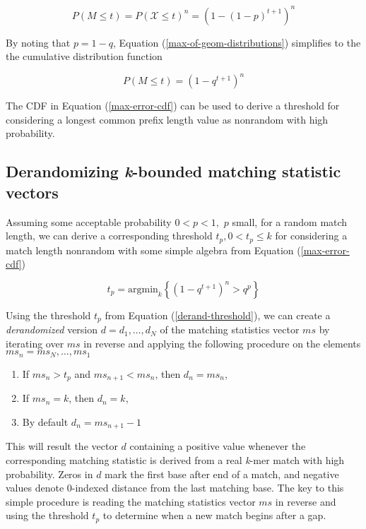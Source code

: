 \documentclass[unnumsec,webpdf,contemporary,large]{oup-authoring-template}%
\theoremstyle{thmstyleone}%
\theoremstyle{thmstyletwo}%
\theoremstyle{thmstylethree}%
\begin{document}
\begin{equation}
    P\left(M \leq t\right) = P\left(\mathcal{X} \leq t\right)^n = \left(1 - \left(1 - p\right)^{t + 1}\right)^n
\label{max-of-geom-distributions}    
\end{equation}

By noting that $p = 1 - q$, Equation (\ref{max-of-geom-distributions}) simplifies to the the cumulative distribution function

\begin{equation}
    P\left(M \leq t\right) = \left(1 - q^{t + 1}\right)^n
\label{max-error-cdf}
\end{equation}

The CDF in Equation (\ref{max-error-cdf}) can be used to derive a threshold for considering a longest common prefix length value as nonrandom with high probability.

\subsection{Derandomizing \textit{k}-bounded matching statistic vectors}

Assuming some acceptable probability $0 < p < 1,$ $p$ small, for a random match length, we can derive a corresponding threshold $t_p, 0 < t_p \leq k$ for considering a match length nonrandom with some simple algebra from Equation (\ref{max-error-cdf})

\begin{equation}
    t_p = \text{argmin}_k \left\{\left(1 - q^{t + 1}\right)^n > q^p \right\}
\label{derand-threshold}
\end{equation}

Using the threshold $t_p$ from Equation (\ref{derand-threshold}), we can create a \emph{derandomized} version $d = d_1, \dots, d_N$ of the matching statistics vector $ms$ by iterating over $ms$ in reverse and applying the following procedure on the elements $ms_n = ms_N, \dots, ms_1$
\begin{enumerate}
\item If $ms_n > t_p$ and $ms_{n + 1} < ms_n$,  then $d_n = ms_n$,
\item If $ms_n = k$, then $d_n = k$,
\item By default $d_n = ms_{n + 1} - 1$
\end{enumerate}

This will result the vector $d$ containing a positive value whenever the corresponding matching statistic is derived from a real \emph{k}-mer match with high probability. Zeros in $d$ mark the first base after end of a match, and negative values denote 0-indexed distance from the last matching base. The key to this simple procedure is reading the matching statistics vector $ms$ in reverse and using the threshold $t_p$ to determine when a new match begins after a gap.
\end{document}
